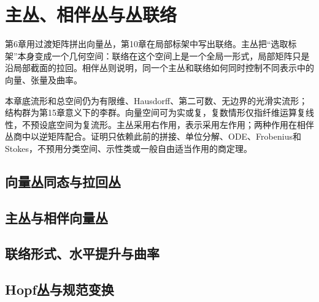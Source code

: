 \chapter{主丛、相伴丛与丛联络}
\label{ch:16-bundles}

第6章用过渡矩阵拼出向量丛，第10章在局部标架中写出联络。主丛把“选取标架”本身变成一个几何空间：联络在这个空间上是一个全局一形式，局部矩阵只是沿局部截面的拉回。相伴丛则说明，同一个主丛和联络如何同时控制不同表示中的向量、张量及曲率。

本章底流形和总空间仍为有限维、Hausdorff、第二可数、无边界的光滑实流形；结构群为第15章意义下的李群。向量空间可为实或复，复数情形仅指纤维运算复线性，不预设底空间为复流形。主丛采用右作用，表示采用左作用；两种作用在相伴丛商中以逆矩阵配合。证明只依赖此前的拼接、单位分解、ODE、Frobenius和Stokes，不预用分类空间、示性类或一般自由适当作用的商定理。

\section{向量丛同态与拉回丛}


\section{主丛与相伴向量丛}



\section{联络形式、水平提升与曲率}



\section{Hopf丛与规范变换}





